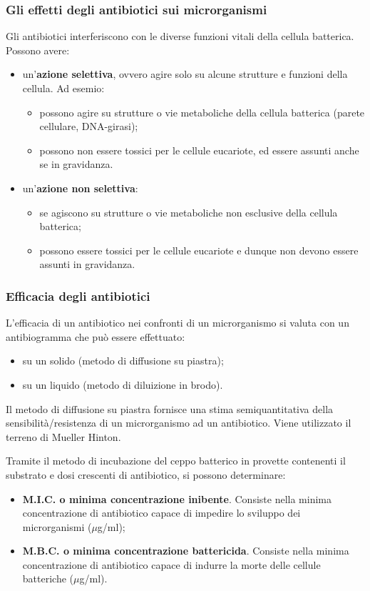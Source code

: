 \documentclass[11pt]{book}
\begin{document}
\subsubsection{Gli effetti degli antibiotici sui microrganismi}
Gli antibiotici interferiscono con le diverse funzioni vitali della cellula batterica.
Possono avere:
\begin{itemize}
\item un'\textbf{azione selettiva}, ovvero agire solo su alcune strutture e funzioni della cellula. Ad esemio:

\begin{itemize}
\item possono agire su strutture o vie metaboliche della cellula batterica (parete cellulare, DNA-girasi);
\item possono non essere tossici per le cellule eucariote, ed essere assunti  anche se in gravidanza.
\end{itemize}

\item un'\textbf{azione non selettiva}:
\begin{itemize}
\item se agiscono su strutture o vie metaboliche non esclusive della cellula batterica;
\item possono essere tossici per le cellule eucariote e dunque non devono essere assunti in gravidanza.
\end{itemize}

\end{itemize}

\subsubsection{Efficacia degli antibiotici}
L’efficacia di un antibiotico nei confronti di un microrganismo si valuta con un antibiogramma che può essere effettuato:
\begin{itemize}
\item su un solido (metodo di diffusione su piastra);
\item su un liquido (metodo di diluizione in brodo).
\end{itemize}

Il metodo di diffusione su piastra fornisce una stima semiquantitativa della sensibilità/resistenza di un microrganismo ad un antibiotico. Viene utilizzato il terreno di Mueller Hinton.

Tramite il metodo di incubazione del ceppo batterico in provette contenenti il substrato e dosi crescenti di antibiotico, si possono determinare:
\begin{itemize}
\item \textbf{M.I.C. o minima concentrazione inibente}. Consiste nella minima concentrazione di antibiotico capace di impedire lo sviluppo dei microrganismi ($\mu$g/ml);
\item \textbf{M.B.C. o minima concentrazione battericida}. Consiste nella minima concentrazione di antibiotico capace di indurre la morte delle cellule batteriche ($\mu$g/ml).
\end{itemize} 
\end{document}
